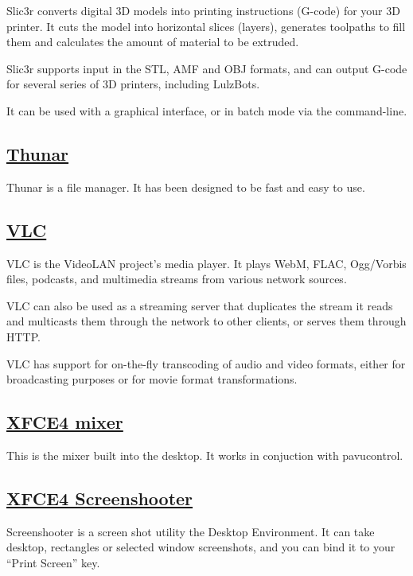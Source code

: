  Slic3r converts digital 3D models into printing instructions (G-code)
 for your 3D printer. It cuts the model into horizontal slices (layers),
 generates toolpaths to fill them and calculates the amount of material
 to be extruded.
 
 Slic3r supports input in the STL, AMF and OBJ formats, and can output
 G-code for several series of 3D printers, including LulzBots.
 
 It can be used with a graphical interface, or in batch mode via the
 command-line.

\subsection{\href{http://thunar.xfce.org}{Thunar}}

 Thunar is a file manager.
 It has been designed to be fast and easy to use.
 
\subsection{\href{http://www.videolan.org/vlc/}{VLC}}

 VLC is the VideoLAN project's media player. It plays
 WebM, FLAC, Ogg/Vorbis files,
 podcasts, and multimedia streams from various network sources.
 
 VLC can also be used as a streaming server that duplicates the stream it
 reads and multicasts them through the network to other clients, or serves
 them through HTTP.
 
 VLC has support for on-the-fly transcoding of audio and video formats,
 either for broadcasting purposes or for movie format transformations.

\subsection{\href{http://www.xfce.org/}{XFCE4 mixer}}

This is the mixer built into the desktop. It works in conjuction with
pavucontrol.

\subsection{\href{http://goodies.xfce.org/projects/applications/xfce4-screenshooter}{XFCE4 Screenshooter}}

 Screenshooter is a screen shot utility the Desktop Environment. It can take
 desktop, rectangles or selected window screenshots, and you can bind it to
 your ``Print Screen'' key.

